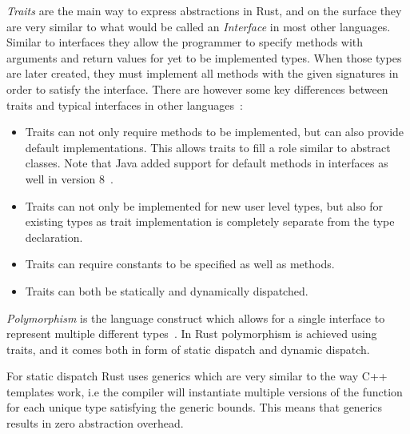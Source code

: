 \documentclass[conference]{IEEEtran}
\begin{document}
\emph{Traits} are the main way to express abstractions in Rust, and on the surface they are very similar to what would be called an \emph{Interface} in most other languages.
Similar to interfaces they allow the programmer to specify methods with arguments and return values for yet to be implemented types.
When those types are later created, they must implement all methods with the given signatures in order to satisfy the interface.
There are however some key differences between traits and typical interfaces in other languages~\cite{rustblog2015:traits}:

\begin{itemize}
    \item
        Traits can not only require methods to be implemented, but can also provide default implementations. This allows traits to fill a role similar to abstract classes.
        Note that Java added support for default methods in interfaces as well in version 8~\cite{oracle:java_default}.
    \item
        Traits can not only be implemented for new user level types, but also for existing types as trait implementation is completely separate from the type declaration.
    \item
        Traits can require constants to be specified as well as methods.
    \item
        Traits can both be statically and dynamically dispatched.
\end{itemize}

\emph{Polymorphism} is the language construct which allows for a single interface to represent multiple different types~\cite{bjarne:polymorphism}.
In Rust polymorphism is achieved using traits, and it comes both in form of static dispatch and dynamic dispatch.

For static dispatch Rust uses generics which are very similar to the way C++ templates work, i.e the compiler will instantiate multiple versions of the function for each unique type satisfying the generic bounds.
This means that generics results in zero abstraction overhead.
\end{document}
